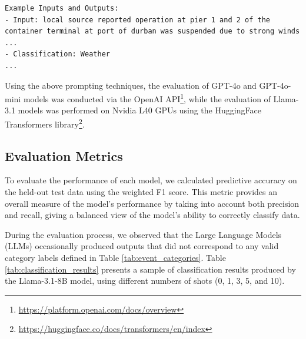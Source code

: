 \begin{lstlisting}[caption={Exemplars Used in Few-Shot Prompting}, 
                   label={lst:exemplars-prompt}, 
                   breaklines=true, 
                   basicstyle=\scriptsize\ttfamily, 
                   xleftmargin=0pt, 
                   framexleftmargin=0pt, 
                   framesep=0pt, 
                   aboveskip=0pt, 
                   belowskip=0pt, 
                   showspaces=false, 
                   showstringspaces=false,
                   keepspaces=true,
                   breakindent=0pt]
Example Inputs and Outputs:
- Input: local source reported operation at pier 1 and 2 of the container terminal at port of durban was suspended due to strong winds ...
- Classification: Weather
... 
\end{lstlisting}


Using the above prompting techniques, the evaluation of GPT-4o and GPT-4o-mini models was conducted via the OpenAI API\footnote{\url{https://platform.openai.com/docs/overview}}, while the evaluation of Llama-3.1 models was performed on Nvidia L40 GPUs using the HuggingFace Transformers library\footnote{\url{https://huggingface.co/docs/transformers/en/index}}.

\subsection{Evaluation Metrics}

To evaluate the performance of each model, we calculated predictive accuracy on the held-out test data using the weighted F1 score. This metric provides an overall measure of the model’s performance by taking into account both precision and recall, giving a balanced view of the model's ability to correctly classify data.

During the evaluation process, we observed that the Large Language Models (LLMs) occasionally produced outputs that did not correspond to any valid category labels defined in Table \ref{tab:event_categories}. Table \ref{tab:classification_results} presents a sample of classification results produced by the Llama-3.1-8B model, using different numbers of shots (0, 1, 3, 5, and 10).

